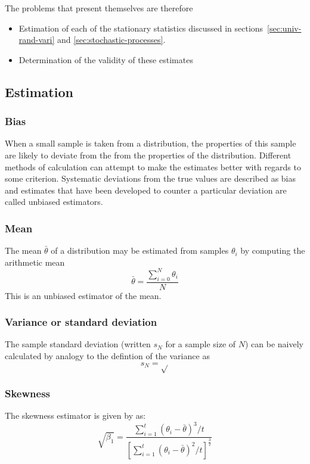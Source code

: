 The problems that present themselves are therefore
\begin{itemize}
\item Estimation of each of the stationary statistics discussed in sections~\ref{sec:univ-rand-vari} and \ref{sec:stochastic-processes}.
\item Determination of the validity of these estimates
\end{itemize}

\subsection{Estimation}
\subsubsection{Bias}
When a small sample is taken from a distribution, the properties of this sample are likely to deviate from the from the properties of the distribution.
Different methods of calculation can attempt to make the estimates better with regards to some criterion.
Systematic deviations from the true values are described as bias and estimates that have been developed to counter a particular deviation are called unbiased estimators.

\subsubsection{Mean}
The mean $\bar{\theta}$ of a distribution may be estimated from samples $\theta_i$ by computing the arithmetic mean
\begin{equation}
  \label{eq:mean}
  \bar{\theta} = \frac{\displaystyle \sum_{i=0}^N \theta_i}{N}
\end{equation}
This is an unbiased estimator of the mean.

\subsubsection{Variance or standard deviation}
The sample standard deviation (written $s_N$ for a sample size of $N$) can be naively calculated by analogy to the defintion of the variance as
\begin{equation}
  \label{eq:samplestandardeviation}
  s_N = \sqrt{}
\end{equation}

\subsubsection{Skewness}
The skewness estimator is given by \citet{mooney1997monte} as:
\begin{equation} 
  \sqrt{\beta_1} =
  \frac{\displaystyle\sum_{i=1}^t \left ( \theta_i - \bar{\theta} \right
    )^3/t} { \left [ \displaystyle\sum_{i=1}^t \left (
        \theta_i-\bar{\theta} \right )^2/t \right ]^\frac{3}{2}} 
\end{equation}

